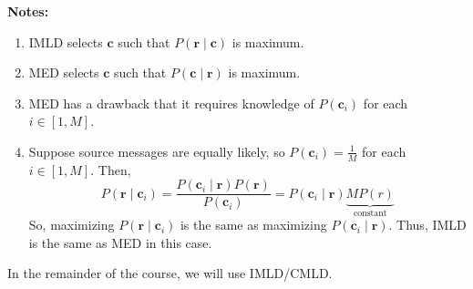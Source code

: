 \textbf{Notes:}
\begin{enumerate}[label=(\roman*)]
    \item IMLD selects $ \symbf{c} $ such that $ P(\symbf{r}\mid \symbf{c}) $ is maximum.
    \item MED selects $ \symbf{c} $ such that $ P(\symbf{c}\mid \symbf{r}) $ is maximum.
    \item MED has a drawback that it requires knowledge of $ P(\symbf{c}_i) $ for
          each $ i\in [1,M] $.
    \item Suppose source messages are equally likely, so
          $ P(\symbf{c}_i)=\frac{1}{M} $ for each $ i\in[1,M] $.
          Then,
          \[ P(\symbf{r}\mid \symbf{c}_i)=\frac{P(\symbf{c}_i\mid \symbf{r})P(\symbf{r})}{P(\symbf{c}_i)}
              =P(\symbf{c}_i\mid \symbf{r}) \underbrace{M P(r)}_{\text{constant}}\]
          So, maximizing $ P(\symbf{r}\mid \symbf{c}_i) $ is the same as maximizing
          $ P(\symbf{c}_i\mid \symbf{r}) $. Thus, IMLD is the same as MED in this case.
\end{enumerate}
In the remainder of the course, we will use IMLD/CMLD\@.
